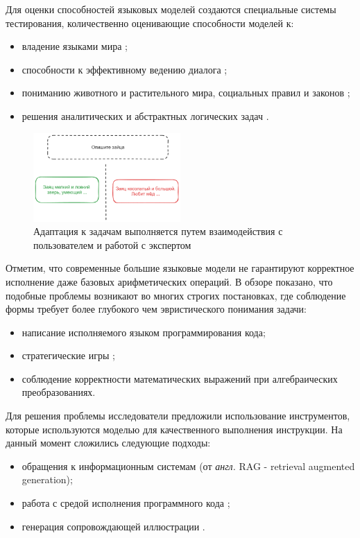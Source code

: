 Для оценки способностей языковых моделей создаются специальные системы тестирования, количественно оценивающие способности моделей к:
\begin{itemize}
    \item владение языками мира \cite{hendrycks2020measuring};
    \item способности к эффективному ведению диалога \cite{zhong2023agieval};
    \item пониманию животного и растительного мира, социальных правил и законов \cite{chollet2019measure} \cite{guha2024legalbench};
    \item решения аналитических и абстрактных логических задач \cite{rein2023gpqa} \cite{cobbe2021training}.
\end{itemize}

\begin{figure}[h]
    \centering
    \includegraphics[width=0.5\textwidth]{assets/work/arch/instruction.excalidraw.png}
    \caption{Адаптация к задачам выполняется путем взаимодействия с пользователем и работой с экспертом}
    \label{instruction}
\end{figure}


Отметим, что современные большие языковые модели не гарантируют корректное исполнение даже базовых арифметических операций. В обзоре \cite{zhao2023survey} показано, 
что подобные проблемы возникают во многих строгих постановках, где соблюдение формы требует 
более глубокого чем эвристического понимания задачи:
\begin{itemize}
    \item написание исполняемого языком программирования кода;
    \item стратегические игры \cite{Adam2024};
    \item соблюдение корректности математических выражений при алгебраических преобразованиях.
\end{itemize} 

Для решения проблемы исследователи предложили использование инструментов, которые используются моделью для качественного
выполнения инструкции. На данный момент сложились следующие подходы:
\begin{itemize}
    \item обращения к информационным системам (от \textit{англ.} RAG - retrieval augmented generation)\cite{lewis2020retrieval};
    \item работа с средой исполнения программного кода \cite{parisi2022talm};
    \item генерация сопровождающей иллюстрации \cite{rombach2022high}.
\end{itemize}










